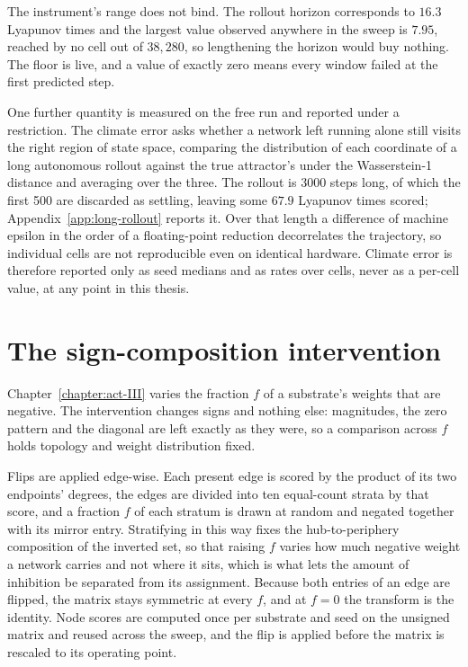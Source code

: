 The instrument's range does not bind. The rollout horizon corresponds to
$16.3$ %
Lyapunov times and the largest value observed anywhere in the sweep is
$7.95$, %
reached by no cell out of
$38{,}280$, %
so lengthening the horizon would buy nothing. The floor is live, and a value of
exactly zero means every window failed at the first predicted step.

One further quantity is measured on the free run and reported under a
restriction. The climate error asks whether a network left running alone still
visits the right region of state space, comparing the distribution of each
coordinate of a long autonomous rollout against the true attractor's under the
Wasserstein-1 distance and averaging over the three. The rollout is
3000 steps %
long, of which the first
500 %
are discarded as settling, leaving some
$67.9$ %
Lyapunov times scored; Appendix~\ref{app:long-rollout} reports it. Over that
length a difference of machine epsilon in the order of a floating-point
reduction decorrelates the trajectory, so individual cells are not reproducible
even on identical hardware. Climate error is therefore reported only as seed
medians and as rates over cells, never as a per-cell value, at any point in this
thesis.




\section{The sign-composition intervention}
\label{sec:methods-sign}
\bigskip

Chapter~\ref{chapter:act-III} varies the fraction $f$ of a substrate's weights
that are negative. The intervention changes signs and nothing else: magnitudes,
the zero pattern and the diagonal are left exactly as they were, so a comparison
across $f$ holds topology and weight distribution fixed.

Flips are applied edge-wise. Each present edge is scored by the product of its
two endpoints' degrees, the edges are divided into
ten %
equal-count strata by that score, and a fraction $f$ of each stratum is drawn at
random and negated together with its mirror entry. Stratifying in this way fixes
the hub-to-periphery composition of the inverted set, so that raising $f$ varies
how much negative weight a network carries and not where it sits, which is what
lets the amount of inhibition be separated from its assignment. Because both
entries of an edge are flipped, the matrix stays symmetric at every $f$, and at
$f = 0$ the transform is the identity. Node scores are computed once per
substrate and seed on the unsigned matrix and reused across the sweep, and the
flip is applied before the matrix is rescaled to its operating point.

